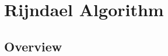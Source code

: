 \documentclass[aspectratio=169,24pt]{beamer}
\begin{document}


\section{Rijndael Algorithm}

\subsection*{Overview}
\end{document}
